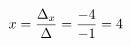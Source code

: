 \documentclass[preview]{standalone}
\begin{document}
\begin{align*}
\special{dvisvgm:raw <g id='unique000'>}x = \frac{\Delta_x}{\Delta} = \frac{-4}{-1} = 4\special{dvisvgm:raw </g>}
\end{align*}
\end{document}
